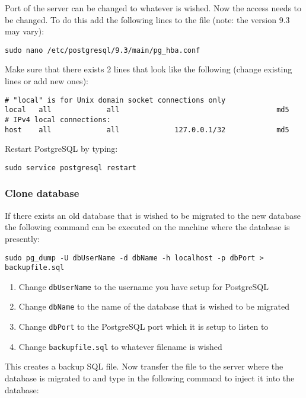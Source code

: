 Port of the server can be changed to whatever is wished. Now the access needs to be changed. To do this add the following lines to the file (note: the version 9.3 may vary): 
\begin{verbatim}
sudo nano /etc/postgresql/9.3/main/pg_hba.conf
\end{verbatim}
Make sure that there exists 2 lines that look like the following (change existing lines or add new ones):
\begin{verbatim}
# "local" is for Unix domain socket connections only
local   all             all                                     md5
# IPv4 local connections:
host    all             all             127.0.0.1/32            md5
\end{verbatim}
Restart PostgreSQL by typing:
\begin{verbatim}
sudo service postgresql restart
\end{verbatim}


\subsubsection{Clone database}
If there exists an old database that is wished to be migrated to the new database the following command can be executed on the machine where the database is presently:

\begin{verbatim}
sudo pg_dump -U dbUserName -d dbName -h localhost -p dbPort > backupfile.sql
\end{verbatim}
\begin{enumerate}
\item Change \verb+dbUserName+ to the username you have setup for PostgreSQL
\item Change \verb+dbName+ to the name of the database that is wished to be migrated
\item Change \verb+dbPort+ to the PostgreSQL port which it is setup to listen to
\item Change \verb+backupfile.sql+ to whatever filename is wished
\end{enumerate}

This creates a backup SQL file. Now transfer the file to the server where the database is migrated to and type in the following command to inject it into the database:

